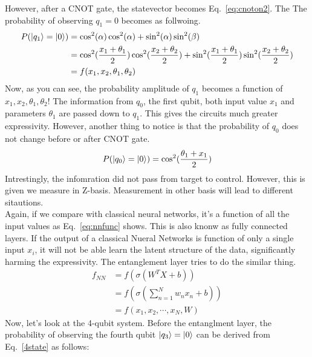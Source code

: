 \documentclass[12pt]{article}
\numberwithin{equation}{section}  %
\theoremstyle{definition}
\theoremstyle{plain}
\theoremstyle{remark}
\begin{document}
However, after a CNOT gate, the statevector becomes Eq.~\ref{eq:cnoton2}. The The probability of observing $q_1=0$ becomes as follwoing. 
\begin{equation}
\begin{aligned}
P(\ket{q_1}=\ket{0})&=\cos^2(\alpha)\cos^2(\alpha)+\sin^2(\alpha)\sin^2(\beta)\\
&=\cos^2(\frac{x_1+\theta_1}{2})\cos^2(\frac{x_2+\theta_2}{2})+\sin^2(\frac{x_1+\theta_1}{2})\sin^2(\frac{x_2+\theta_2}{2})\\
&=f(x_1,x_2,\theta_1,\theta_2)
\end{aligned}
\end{equation}
Now, as you can see, the probability amplitude of $q_1$ becomes a function of $x_1,x_2,\theta_1,\theta_2$! The information from $q_0$, the first qubit, both input value $x_1$ and parameters $\theta_1$ are passed down to $q_1$. This gives the circuits much greater expressivity. However, another thing to notice is that the probability of $q_0$ does not change before or after CNOT gate. 
\begin{equation}
    P(\ket{q_0}=\ket{0})=\cos^2(\frac{\theta_1+x_1}{2})
\end{equation}
Intrestingly, the infomration did not pass from target to control. However, this is given we measure in Z-basis. Measurement in other basis will lead to different sitautions.\\
Again, if we compare with classical neural networks, it's a function of all the input values as Eq.~\ref{eq:nnfunc} shows. This is also knonw as fully connected layers. If the output of a classical Nueral Networks is function of only a single input $x_i$, it will not be able learn the latent structure of the data, significantly harming the expressivity. The entanglement layer tries to do the similar thing. 
\begin{equation}
\begin{aligned}
f_{NN}&=f(\sigma(W^TX+b))\\
&=f(\sigma(\sum_{n=1}^{N}w_nx_n+b))\\
&=f(x_1,x_2,\cdots,x_N,W)
\end{aligned}
\label{eq:nnfunc}
\end{equation}
Now, let's look at the 4-qubit system. Before the entanglment layer, the probability of observing the fourth qubit $\ket{q_3}=\ket{0}$ can be derived from Eq.~\ref{4state} as follows:
\end{document}
